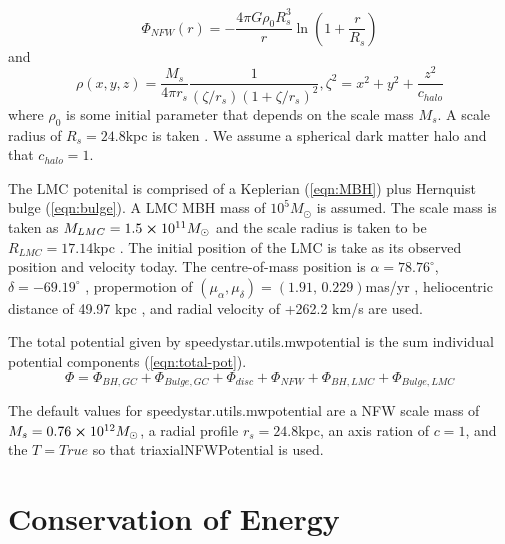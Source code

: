 \documentclass[12pt]{article}
\begin{document}
\begin{equation}\label{eqn:NFW}
    \Phi_{NFW}(r) =  -\frac{4\pi G\rho_0 R_s^3}{r}\ln\left(1 + \frac{r}{R_s}\right)
\end{equation}
and 
\begin{equation}\label{eqn:NFWRho}
    \rho(x,y,z) = \frac{M_s}{4\pi r_s}\frac{1}{(\zeta/r_s)(1+\zeta/r_s)^2}, \zeta^2 = x^2 + y^2 + \frac{z^2}{c_{halo}}
\end{equation}
where $\rho_0$ is some initial parameter that depends on the scale mass $M_s$. A scale radius of $R_s = 24.8$kpc is taken \cite{Rossi}. We assume a spherical dark matter halo and that $c_{halo} =1$. 

The LMC potenital is comprised of a Keplerian (\ref{eqn:MBH}) plus Hernquist bulge (\ref{eqn:bulge}). A LMC MBH mass of $10^5M_\odot$ is assumed. The scale mass is taken as $M_{LMC} = 1.5\cross 10^{11}M_\odot$ and the scale radius is taken to be $R_{LMC} = 17.14$kpc \cite{Evans_2021}. The initial position of the LMC is take as its observed position and velocity today. The centre-of-mass position is $\alpha = 78.76^{\circ}$, $\delta = -69.19^{\circ}$ \cite{Zivick}, propermotion of $(\mu_\alpha, \mu_\delta) = (1.91,\,0.229)$mas/yr \cite{Kall}, heliocentric distance of 49.97 kpc \cite{Pietrzy}, and radial velocity of +262.2 km/s \cite{van} are used. 

The total potential given by {\selectfont speedystar.utils.mwpotential} is the sum individual potential components (\ref{eqn:total-pot}). 
\begin{equation}\label{eqn:total-pot}
    \Phi = \Phi_{BH,GC} + \Phi_{Bulge, GC} + \Phi_{disc} + \Phi_{NFW} + \Phi_{BH,LMC} + \Phi_{Bulge, LMC}
\end{equation}

The default values for {\selectfont speedystar.utils.mwpotential} are a NFW scale mass of $M_s = 0.76\cross10^{12}M_\odot$, a radial profile $r_s  = 24.8$kpc, an axis ration of $c=1$, and the $T=True$ so that {\selectfont triaxialNFWPotential} is used. 

\section{Conservation of Energy} \label{sec:consE}
\end{document}
